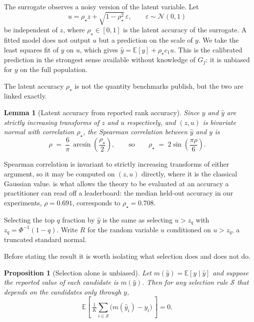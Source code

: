 \documentclass{article}
\theoremstyle{plain}
\newtheorem{proposition}[theorem]{Proposition}
\newtheorem{lemma}[theorem]{Lemma}
\theoremstyle{definition}
\newcommand{\yhat}{\hat{y}}
\newcommand{\Exp}{\mathbb{E}}
\newcommand{\Normal}{\mathcal{N}}
\begin{document}
The surrogate observes a noisy version of the latent variable. Let
\begin{equation}
u = \rho_\star z + \sqrt{1-\rho_\star^2}\,\varepsilon,
\qquad \varepsilon \sim \Normal(0,1)
\label{eq:signal}
\end{equation}
be independent of $z$, where $\rho_\star \in [0,1]$ is the latent accuracy of the
surrogate. A fitted model does not output $u$ but a prediction on the scale of $y$. We
take the least squares fit of $y$ on $u$, which gives $\yhat = \Exp[y] + \rho_\star c_1
u$. This is the calibrated prediction in the strongest sense available without
knowledge of $G_{\!f}$: it is unbiased for $y$ on the full population.

The latent accuracy $\rho_\star$ is not the quantity benchmarks publish, but the two are
linked exactly.

\begin{lemma}[Latent accuracy from reported rank accuracy]
\label{lem:rho}
Since $y$ and $\yhat$ are strictly increasing transforms of $z$ and $u$ respectively,
and $(z,u)$ is bivariate normal with correlation $\rho_\star$, the Spearman correlation
between $\yhat$ and $y$ is
\begin{equation}
\rho \;=\; \frac{6}{\pi}\,\arcsin\!\left(\frac{\rho_\star}{2}\right),
\qquad\text{so}\qquad
\rho_\star \;=\; 2\sin\!\left(\frac{\pi\rho}{6}\right).
\label{eq:rholink}
\end{equation}
\end{lemma}

Spearman correlation is invariant to strictly increasing transforms of either argument,
so it may be computed on $(z,u)$ directly, where it is the classical Gaussian value.
 is what allows the theory to be evaluated at an accuracy a practitioner
can read off a leaderboard: the median held-out accuracy in our experiments,
$\rho = 0.691$, corresponds to $\rho_\star = 0.708$.

Selecting the top $q$ fraction by $\yhat$ is the same as selecting $u > z_q$ with $z_q =
\Phi^{-1}(1-q)$. Write $R$ for the random variable $u$ conditioned on $u > z_q$, a
truncated standard normal.

Before stating the result it is worth isolating what selection does and does not do.

\begin{proposition}[Selection alone is unbiased]
\label{prop:tower}
Let $m(\yhat) = \Exp[y \mid \yhat]$ and suppose the reported value of each candidate is
$m(\yhat)$. Then for any selection rule $\mathcal{S}$ that depends on the candidates
only through $\yhat$,
\begin{equation}
\Exp\!\left[\,\tfrac{1}{K}\textstyle\sum_{i \in \mathcal{S}}\big(m(\yhat_i) - y_i\big)\,\right] = 0 .
\label{eq:tower}
\end{equation}
\end{proposition}
\end{document}
